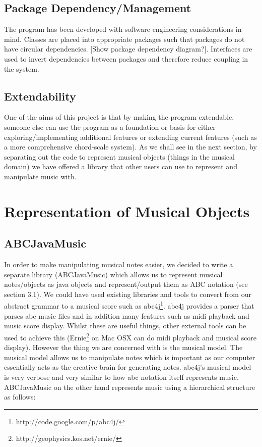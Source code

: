 \documentclass[pdftex,12pt,a4paper]{report}
\begin{document}
\subsection{Package Dependency/Management}
The program has been developed with software engineering considerations in mind. Classes are placed into appropriate packages such that packages do not have circular dependencies. [Show package dependency diagram?]. Interfaces are used to invert dependencies between packages and therefore reduce coupling in the system. 

\subsection{Extendability}
One of the aims of this project is that by making the program extendable, someone else can use the program as a foundation or basis for either exploring/implementing additional features or extending current features (such as a more comprehensive chord-scale system). As we shall see in the next section, by separating out the code to represent musical objects (things in the musical domain) we have offered a library that other users can use to represent and manipulate music with.

\section{Representation of Musical Objects}

\subsection{ABCJavaMusic}
In order to make manipulating musical notes easier, we decided to write a separate library (ABCJavaMusic) which allows us to represent musical notes/objects as java objects and represent/output them as ABC notation (see section 3.1). We could have used existing libraries and tools to convert from our abstract grammar to a musical score such as abc4j\footnote{http://code.google.com/p/abc4j/}. abc4j provides a parser that parses abc music files and in addition many features such as midi playback and music score display. Whilst these are useful things, other external tools can be used to achieve this (Ernie\footnote{http://geophysics.kos.net/ernie/} on Mac OSX can do midi playback and musical score display).
However the thing we are concerned with is the musical model. The musical model allows us to manipulate notes which is important as our computer essentially acts as the creative brain for generating notes. abc4j's musical model is very verbose and very similar to how abc notation itself represents music. 
ABCJavaMusic on the other hand represents music using a hierarchical structure as follows:
\end{document}
